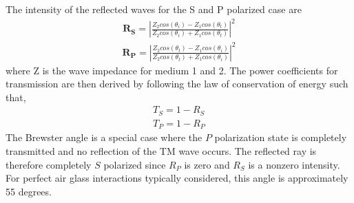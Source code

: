 The intensity of the reflected waves for the S and P polarized case are
%
\begin{align}
    \mathbf{R_S} = |\frac{Z_2cos(\theta_i)-Z_1cos(\theta_t)}{Z_2cos(\theta_i)+Z_1cos(\theta_t)}|^2
\end{align}
\begin{align}
    \mathbf{R_P} = |\frac{Z_2cos(\theta_t)-Z_1cos(\theta_i)}{Z_2cos(\theta_t)+Z_1cos(\theta_i)}|^2
\end{align}
%
where Z is the wave impedance for medium 1 and 2.  The power coefficients for transmission are then derived by following the law of conservation of energy such that,
%
\begin{align}
    T_S = 1 - R_S \\
    T_P = 1 - R_P
\end{align}
%
The Brewster angle is a special case where the $P$ polarization state is completely transmitted and no reflection of the TM wave occurs.  The reflected ray is therefore completely $S$ polarized since $R_P$ is zero and $R_S$ is a nonzero intensity.  For perfect air glass interactions typically considered, this angle is approximately 55 degrees.

